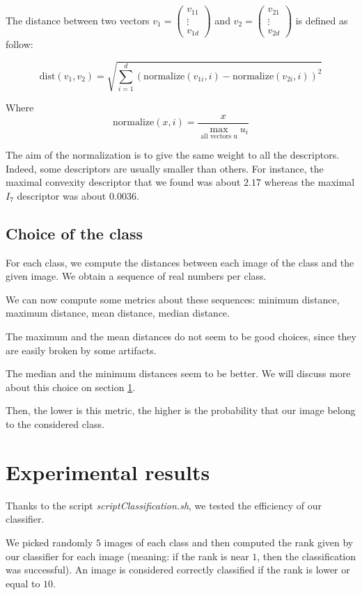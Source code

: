 \documentclass[a4paper,12pt]{article}
\theoremstyle{example}
\theoremstyle{remark}
\theoremstyle{definition}
\begin{document}
The distance between two vectors $v_1 = \begin{pmatrix}v_{11}\\\vdots\\ v_{1d}\end{pmatrix}$ and $v_2 = \begin{pmatrix}v_{21}\\\vdots\\ v_{2d}\end{pmatrix}$ is defined as follow:

\[\mathrm{dist}(v_1, v_2) = \sqrt{\sum_{i=1}^d \left(\mathrm{normalize}(v_{1i}, i)-\mathrm{normalize}(v_{2i}, i)\right)^2}\]

Where 
\[\mathrm{normalize}(x, i) = \frac{x}{\max_{\text{all vectors u}}u_i}\]

The aim of the normalization is to give the same weight to all the descriptors. Indeed, some descriptors are usually smaller than others. For instance, the maximal convexity descriptor that we found was about $2.17$ whereas the maximal $I_7$ descriptor was about $0.0036$.

\subsection{Choice of the class}

For each class, we compute the distances between each image of the class and the given image. We obtain a sequence of real numbers per class.

We can now compute some metrics about these sequences: minimum distance, maximum distance, mean distance, median distance.

The maximum and the mean distances do not seem to be good choices, since they are easily broken by some artifacts.

The median and the minimum distances seem to be better. We will discuss more about this choice on section \ref{exp}.

Then, the lower is this metric, the higher is the probability that our image belong to the considered class.


\section{Experimental results}
\label{exp}

Thanks to the script \emph{scriptClassification.sh}, we tested the efficiency of our classifier.

We picked randomly $5$ images of each class and then computed the rank given by our classifier for each image (meaning: if the rank is near $1$, then the classification was successful). An image is considered correctly classified if the rank is lower or equal to $10$.
\end{document}
